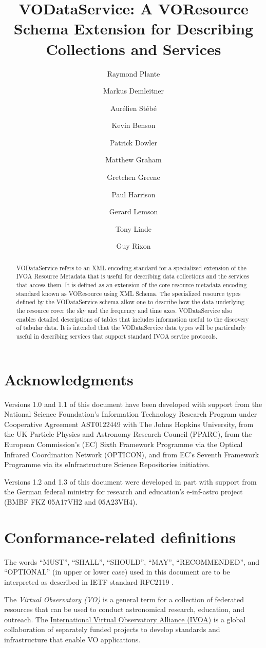 \documentclass[11pt,a4paper]{ivoa}
\title{VODataService: A VOResource Schema Extension for Describing
Collections and Services}
\author[http://www.ivoa.net/twiki/bin/view/IVOA/RayPlante]{Raymond Plante}
\author[http://www.ivoa.net/twiki/bin/view/IVOA/MarkusDemleitner]{Markus Demleitner}
\author[http://www.ivoa.net/twiki/bin/view/IVOA/AurelienStebe]{Aurélien Stébé}
\author[http://www.ivoa.net/twiki/bin/view/IVOA/KevinBenson]{Kevin Benson}
\author[http://www.ivoa.net/twiki/bin/view/IVOA/PatrickDowler]{Patrick Dowler}
\author[http://www.ivoa.net/twiki/bin/view/IVOA/MatthewGraham]{Matthew Graham}
\author[http://www.ivoa.net/twiki/bin/view/IVOA/GretchenGreene]{Gretchen Greene}
\author[http://www.ivoa.net/twiki/bin/view/IVOA/PaulHarrison]{Paul Harrison}
\author[http://www.ivoa.net/twiki/bin/view/IVOA/GerardLemson]{Gerard Lemson}
\author[http://www.ivoa.net/twiki/bin/view/IVOA/TonyLinde]{Tony Linde}
\author[http://www.ivoa.net/twiki/bin/view/IVOA/GuyRixon]{Guy Rixon}
\begin{document}
\begin{abstract}
VODataService refers to an XML encoding standard for a specialized
extension of the IVOA Resource Metadata that is useful for describing
data collections and the services that access them.  It is defined as
an extension of the core resource metadata encoding standard known as
VOResource \citep{2018ivoa.spec.0625P} using XML Schema.
The specialized resource types defined by the VODataService schema
allow one to describe how the data underlying the resource cover the
sky and the frequency and time axes.
VODataService also enables detailed
descriptions of tables that includes information useful to the
discovery of tabular data.  It is intended that the VODataService data
types will be particularly useful in describing services that support
standard IVOA service protocols.
\end{abstract}

\section*{Acknowledgments}

Versions 1.0 and 1.1 of this document have been developed with support from the
National Science Foundation's
Information Technology Research Program under Cooperative Agreement
AST0122449 with The Johns Hopkins University, from the
UK Particle Physics and Astronomy
Research Council (PPARC), from the European Commission's (EC)
Sixth
Framework Programme via the
Optical Infrared Coordination Network (OPTICON), and from EC's
Seventh Framework Programme
via its
eInfrastructure Science Repositories initiative.

Versions 1.2 and 1.3 of this document were
developed in part with support from the
German federal ministry for research and education's e-inf-astro project (BMBF
FKZ 05A17VH2 and 05A23VH4).


\section*{Conformance-related definitions}

The words ``MUST'', ``SHALL'', ``SHOULD'', ``MAY'', ``RECOMMENDED'', and
``OPTIONAL'' (in upper or lower case) used in this document are to be
interpreted as described in IETF standard RFC2119 \citep{std:RFC2119}.

The \emph{Virtual Observatory (VO)} is a
general term for a collection of federated resources that can be used
to conduct astronomical research, education, and outreach.
The \href{http://www.ivoa.net}{International
Virtual Observatory Alliance (IVOA)} is a global
collaboration of separately funded projects to develop standards and
infrastructure that enable VO applications.
\end{document}
